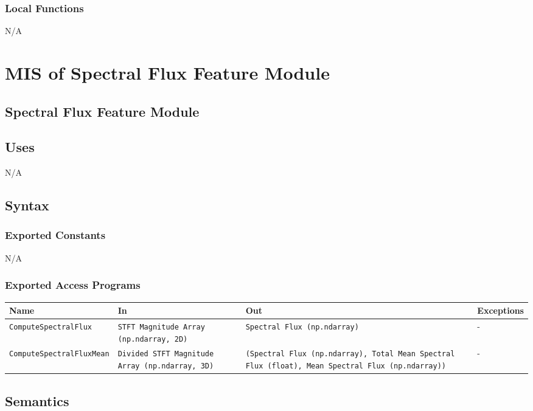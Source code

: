 \documentclass[12pt, titlepage]{article}
\begin{document}
{\subsubsection{Local Functions}
N/A
}

{\color{red}
\section{MIS of Spectral Flux Feature Module}

\subsection{Spectral Flux Feature Module}

\subsection{Uses}
N/A

\subsection{Syntax}

\subsubsection{Exported Constants}
N/A

\subsubsection{Exported Access Programs}

\begin{center}
  \begin{tabular}{|p{6cm}|p{4cm}|p{3cm}|p{2cm}|}
  \hline
  \textbf{Name} & \textbf{In} & \textbf{Out} & \textbf{Exceptions} \\
  \hline
  \texttt{ComputeSpectralFlux} & \texttt{STFT Magnitude Array (np.ndarray, 2D)} & \texttt{Spectral Flux (np.ndarray)} & - \\
  \hline
  \texttt{ComputeSpectralFluxMean} & \texttt{Divided STFT Magnitude Array (np.ndarray, 3D)} & \texttt{(Spectral Flux (np.ndarray), Total Mean Spectral Flux (float), Mean Spectral Flux (np.ndarray))} & - \\
  \hline
  \end{tabular}
\end{center}

\subsection{Semantics}

}
\end{document}
